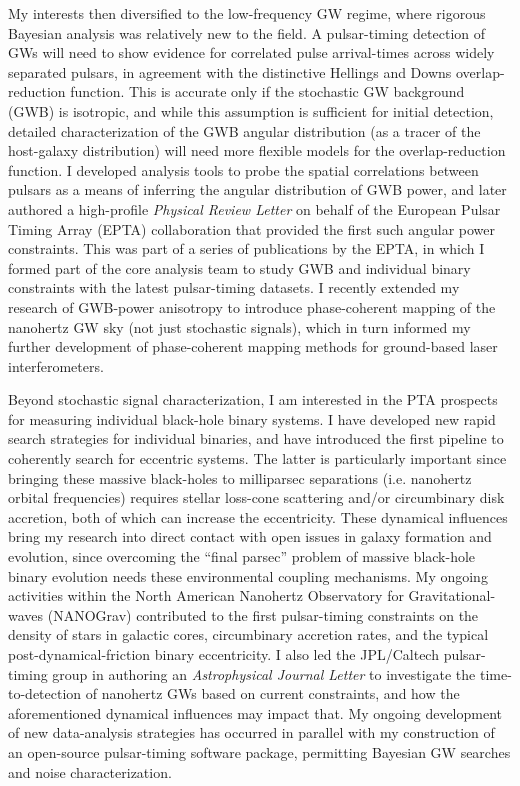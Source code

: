 \documentclass[11pt,letterpaper,sans]{moderncv} %
\begin{document}
My interests then diversified to the low-frequency GW regime, where rigorous Bayesian analysis was relatively new to the field. A pulsar-timing detection of GWs will need to show evidence for correlated pulse arrival-times across widely separated pulsars, in agreement with the distinctive Hellings and Downs overlap-reduction function. This is accurate only if the stochastic GW background (GWB) is isotropic, and while this assumption is sufficient for initial detection, detailed characterization of the GWB angular distribution (as a tracer of the host-galaxy distribution) will need more flexible models for the overlap-reduction function. I developed analysis tools to probe the spatial correlations between pulsars as a means of inferring the angular distribution of GWB power, and later authored a high-profile \textit{Physical Review Letter} on behalf of the European Pulsar Timing Array (EPTA) collaboration that provided the first such angular power constraints. This was part of a series of publications by the EPTA, in which I formed part of the core analysis team to study GWB and individual binary constraints with the latest pulsar-timing datasets. I recently extended my research of GWB-power anisotropy to introduce phase-coherent mapping of the nanohertz GW sky (not just stochastic signals), which in turn informed my further development of phase-coherent mapping methods for ground-based laser interferometers.

Beyond stochastic signal characterization, I am interested in the PTA prospects for measuring individual black-hole binary systems. I have developed new rapid search strategies for individual binaries, and have introduced the first pipeline to coherently search for eccentric systems. The latter is particularly important since bringing these massive black-holes to milliparsec separations (i.e. nanohertz orbital frequencies) requires stellar loss-cone scattering and/or circumbinary disk accretion, both of which can increase the eccentricity. These dynamical influences bring my research into direct contact with open issues in galaxy formation and evolution, since overcoming the ``final parsec'' problem of massive black-hole binary evolution needs these environmental coupling mechanisms. My ongoing activities within the North American Nanohertz Observatory for Gravitational-waves (NANOGrav) contributed to the first pulsar-timing constraints on the density of stars in galactic cores, circumbinary accretion rates, and the typical post-dynamical-friction binary eccentricity. I also led the JPL/Caltech pulsar-timing group in authoring an \textit{Astrophysical Journal Letter} to investigate the time-to-detection of nanohertz GWs based on current constraints, and how the aforementioned dynamical influences may impact that. My ongoing development of new data-analysis strategies has occurred in parallel with my construction of an open-source pulsar-timing software package, permitting Bayesian GW searches and noise characterization.
\end{document}
